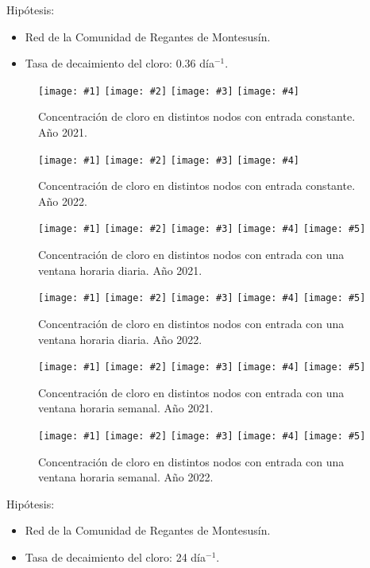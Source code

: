 \documentclass[review,authoryear]{elsarticle}
\newcommand{\FIGIV}[6]
{
	\begin{figure}[ht!]
		\centering
		\texttt{[image: \#1]}
		\texttt{[image: \#2]}
		\texttt{[image: \#3]}
		\texttt{[image: \#4]}
		\caption{#5.\label{#6}}
	\end{figure}
}
\newcommand{\FIGV}[7]
{
	\begin{figure}[ht!]
		\centering
		\texttt{[image: \#1]}
		\texttt{[image: \#2]}
		\texttt{[image: \#3]}
		\texttt{[image: \#4]}
		\texttt{[image: \#5]}
		\caption{#6.\label{#7}}
	\end{figure}
}
\begin{document}
Hipótesis:
\begin{itemize}
\item Red de la Comunidad de Regantes de Montesusín.
\item Tasa de decaimiento del cloro: 0.36 día$^{-1}$.
\end{itemize}

\FIGIV{24-0.36-2021-chlorine-constant-0.eps}{24-0.36-2021-chlorine-constant-2.eps}
{24-0.36-2021-chlorine-constant-6665.eps}{24-0.36-2021-chlorine-constant-172.eps}
{Concentración de cloro en distintos nodos con entrada constante. Año 2021}
{Fig0362021ChlorineConstant}

\FIGIV{24-0.36-2022-chlorine-constant-0.eps}{24-0.36-2022-chlorine-constant-2.eps}
{24-0.36-2022-chlorine-constant-68.eps}{24-0.36-2022-chlorine-constant-172.eps}
{Concentración de cloro en distintos nodos con entrada constante. Año 2022}
{Fig0362022ChlorineConstant}

\FIGV{24-0.36-2021-chlorine-day-0.eps}{24-0.36-2021-chlorine-day-2.eps}
{24-0.36-2021-chlorine-day-65.eps}{24-0.36-2021-chlorine-day-6665.eps}
{24-0.36-2021-chlorine-day-172.eps}
{Concentración de cloro en distintos nodos con entrada con una ventana horaria
diaria. Año 2021}{Fig0362021ChlorineDay}

\FIGV{24-0.36-2022-chlorine-day-0.eps}{24-0.36-2022-chlorine-day-2.eps}
{24-0.36-2022-chlorine-day-6634.eps}{24-0.36-2022-chlorine-day-68.eps}
{24-0.36-2022-chlorine-day-172.eps}
{Concentración de cloro en distintos nodos con entrada con una ventana horaria
diaria. Año 2022}{Fig0362022ChlorineDay}

\FIGV{24-0.36-2021-chlorine-week-0.eps}{24-0.36-2021-chlorine-week-2.eps}
{24-0.36-2021-chlorine-week-68.eps}{24-0.36-2021-chlorine-week-123.eps}
{24-0.36-2021-chlorine-week-172.eps}
{Concentración de cloro en distintos nodos con entrada con una ventana horaria
semanal. Año 2021}{Fig0362021ChlorineWeek}

\FIGV{24-0.36-2022-chlorine-week-0.eps}{24-0.36-2022-chlorine-week-2.eps}
{24-0.36-2022-chlorine-week-6634.eps}{24-0.36-2022-chlorine-week-139.eps}
{24-0.36-2022-chlorine-week-172.eps}
{Concentración de cloro en distintos nodos con entrada con una ventana horaria
semanal. Año 2022}{Fig0362022ChlorineWeek}

\clearpage
Hipótesis:
\begin{itemize}
\item Red de la Comunidad de Regantes de Montesusín.
\item Tasa de decaimiento del cloro: 24 día$^{-1}$.
\end{itemize}
\end{document}
